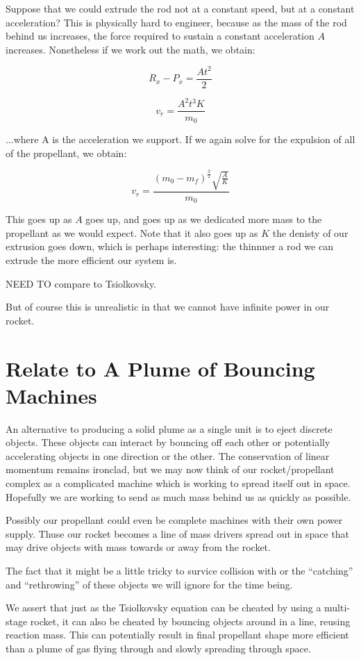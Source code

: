 \documentclass[11pt]{article}
\begin{document}
Suppose that we could extrude the rod not at a constant speed, but
at a constant acceleration? This is physically hard to engineer,
because as the mass of the rod behind us increases, the force required
to sustain a constant acceleration $A$ increases. Nonetheless if we
work out the math, we obtain:

\[
\tag{Constant Acceleration} R_x - P_x  = \frac{A t^2}{2}
\]


\[
v_r = \frac{A^2 t^3 K}{m_0}
\]

...where A is the acceleration we support. If we again solve for the
expulsion of all of the propellant, we obtain:

\[
v_r = \frac{(m_0 - m_f)^\frac{3}{2}\sqrt{\frac{A}{K}}}{m_0}
\]

This goes up as $A$ goes up, and goes up as we dedicated more mass to the propellant as we would expect.
Note that it also goes up as $K$ the denisty of our extrusion goes down, which is perhaps interesting:
the thinnner a rod we can extrude the more efficient our system is.

NEED TO compare to Tsiolkovsky.

But of course this is unrealistic in that we cannot have infinite power in our rocket.

\section{Relate to A Plume of Bouncing Machines}

An alternative to producing a solid plume as a single unit is to eject discrete objects.
These objects can interact by bouncing off each other or potentially accelerating objects
in one direction or the other.  The conservation of linear momentum remains ironclad,
but we may now think of our rocket/propellant complex as a complicated machine which
is working to spread itself out in space. Hopefully we are working to send as much
mass behind us as quickly as possible.

Possibly our propellant could even be complete machines with their own power supply.
Thuse our rocket becomes a line of mass drivers spread out in space that may drive
objects with mass towards or away from the rocket.

The fact that it might be a little tricky to survice collision with or the ``catching'' and
``rethrowing'' of these objects we will ignore for the time being.

We assert that just as the Tsiolkovsky equation can be cheated by using a multi-stage
rocket, it can also be cheated by bouncing objects around in a line, reusing reaction mass.
This can potentially result in final propellant shape more efficient than a plume of
gas flying through and slowly spreading through space.
\end{document}
